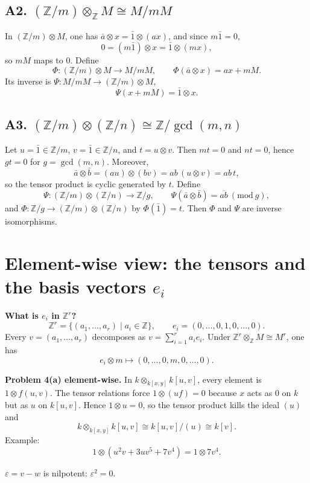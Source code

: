 \documentclass[12pt,a4paper]{article}
\theoremstyle{plain}
\theoremstyle{definition}      %
\begin{document}
	\subsection*{A2. \((\mathbb Z/m)\otimes_{\mathbb Z} M \cong M/mM\)}
	In \((\mathbb Z/m)\otimes M\), one has \(\bar a\otimes x=\bar 1\otimes (ax)\), and since \(m\bar 1=0\),
	\[
	0=(m\bar 1)\otimes x=\bar 1\otimes (mx),
	\]
	so \(mM\) maps to \(0\). Define
	\[
	\Phi:(\mathbb Z/m)\otimes M\to M/mM,\qquad \Phi(\bar a\otimes x)=ax+mM.
	\]
	Its inverse is \(\Psi:M/mM\to (\mathbb Z/m)\otimes M\),
	\[
	\Psi(x+mM)=\bar 1\otimes x.
	\]
	
	\subsection*{A3. \((\mathbb Z/m)\otimes(\mathbb Z/n)\cong \mathbb Z/\gcd(m,n)\)}
	Let \(u=\bar 1\in\mathbb Z/m\), \(v=\bar 1\in\mathbb Z/n\), and \(t=u\otimes v\). Then
	\(mt=0\) and \(nt=0\), hence \(gt=0\) for \(g=\gcd(m,n)\). Moreover,
	\[
	\bar a\otimes \bar b=(au)\otimes(bv)=ab\,(u\otimes v)=ab\,t,
	\]
	so the tensor product is cyclic generated by \(t\). Define
	\[
	\Psi:(\mathbb Z/m)\otimes(\mathbb Z/n)\to \mathbb Z/g,\qquad \Psi(\bar a\otimes \bar b)=\overline{ab}\ (\mathrm{mod}\ g),
	\]
	and \(\Phi:\mathbb Z/g\to (\mathbb Z/m)\otimes(\mathbb Z/n)\) by \(\Phi(\bar 1)=t\).
	Then \(\Phi\) and \(\Psi\) are inverse isomorphisms.
	
	\section*{Element-wise view: the tensors and the basis vectors \(e_i\)}
	
	\textbf{What is \(e_i\) in \(\mathbb Z^r\)?}
	\[
	\mathbb Z^r=\{(a_1,\dots,a_r)\mid a_i\in\mathbb Z\},\qquad
	e_i=(0,\dots,0,1,0,\dots,0).
	\]
	Every \(v=(a_1,\dots,a_r)\) decomposes as \(v=\sum_{i=1}^r a_i e_i\). Under
	\(\mathbb Z^r\otimes_{\mathbb Z} M\cong M^r\), one has
	\[
	e_i\otimes m \longmapsto (0,\dots,0,m,0,\dots,0).
	\]
	
	\medskip
	\textbf{Problem 4(a) element-wise.}
	In \(k\otimes_{k[x,y]}k[u,v]\), every element is \(1\otimes f(u,v)\).
	The tensor relations force \(1\otimes (u f)=0\) because \(x\) acts as \(0\) on \(k\) but as \(u\) on \(k[u,v]\).
	Hence \(1\otimes u=0\), so the tensor product kills the ideal \((u)\) and
	\[
	k\otimes_{k[x,y]}k[u,v]\cong k[u,v]/(u)\cong k[v].
	\]
	Example:
	\[
	1\otimes(u^2v+3uv^5+7v^4)=1\otimes 7v^4.
	\]
	
	\medskip
 \(\varepsilon=v-w\) is nilpotent: \(\varepsilon^2=0\).
 
\end{document}
